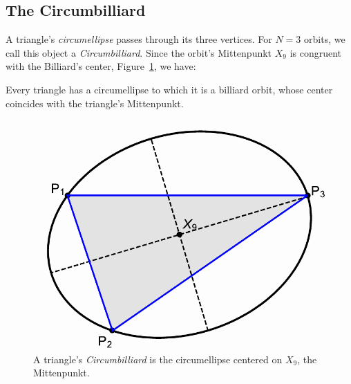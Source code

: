 \subsection{The Circumbilliard}

A triangle's {\em circumellipse} \cite{mw} passes through its three vertices. For $N=3$ orbits, we call this object a {\em Circumbilliard}. Since the orbit's Mittenpunkt $X_9$ is congruent with the Billiard's center, Figure~\ref{fig:circumbilliard}, we have:
%
\begin{observation}
Every triangle has a circumellipse to which it is a billiard orbit, whose center coincides with the triangle's Mittenpunkt.
\end{observation}
%
\begin{figure}[h]
    \centering
    \includegraphics[width=.4\textwidth]{pics/0056_circumplot.pdf}
    \caption{A triangle's {\em Circumbilliard} is the circumellipse centered on $X_9$, the Mittenpunkt.}
    \label{fig:circumbilliard}
\end{figure}
